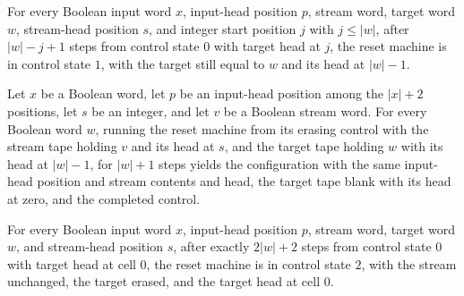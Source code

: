 \begin{lemma}
\label{Complexity.clWipe_forward}
\leanok
{}
For every Boolean input word $x$, input-head position $p$, stream word, target word $w$,
stream-head position $s$, and integer start position $j$ with $j\le |w|$, after
$|w|-j+1$ steps from control state $0$ with target head at $j$, the reset machine is in
control state $1$, with the target still equal to $w$ and its head at $|w|-1$.
\end{lemma}

\begin{lemma}
\label{Complexity.clWipe_backward}
\leanok
{}
Let $x$ be a Boolean word, let $p$ be an input-head position among the $|x|+2$
positions, let $s$ be an integer, and let $v$ be a Boolean stream word. For every
Boolean word $w$, running the reset machine from its erasing control with the stream
tape holding $v$ and its head at $s$, and the target tape holding $w$ with its head at
$|w|-1$, for $|w|+1$ steps yields the configuration with the same input-head position
and stream contents and head, the target tape blank with its head at zero, and the
completed control.
\end{lemma}

\begin{lemma}
\label{Complexity.clWipe_run}
\leanok
{}
For every Boolean input word $x$, input-head position $p$, stream word, target word $w$,
and stream-head position $s$, after exactly $2|w|+2$ steps from control state $0$ with
target head at cell $0$, the reset machine is in control state $2$, with the stream
unchanged, the target erased, and the target head at cell $0$.
\end{lemma}

